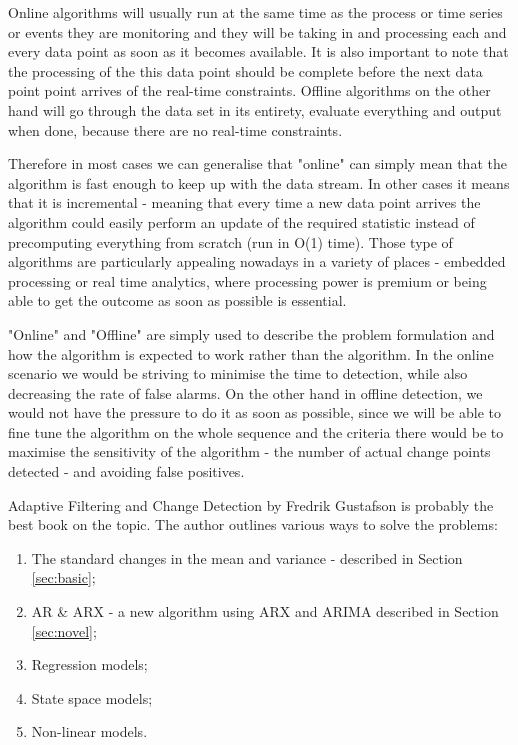 \documentclass[minf,twoside,singlespacing,parskip,frontabs,notimes,12pt]{infthesis} %
\begin{document}
Online algorithms will usually run at the same time as the process or time series or events they are monitoring and they will be taking in and processing each and every data point as soon as it becomes available. It is also important to note that the processing of the this data point should be complete before the next data point point arrives of the real-time constraints. Offline algorithms on the other hand will go through the data set in its entirety, evaluate everything and output when done, because there are no real-time constraints.

Therefore in most cases we can generalise that "online" can simply mean that the algorithm is fast enough to keep up with the data stream. In other cases it means that it is incremental - meaning that every time a new data point arrives the algorithm could easily perform an update of the required statistic instead of precomputing everything from scratch (run in O(1) time). Those type of algorithms are particularly appealing nowadays in a variety of places - embedded processing or real time analytics, where processing power is  premium or being able to get the outcome as soon as possible is essential. 

"Online" and "Offline" are simply used to describe the problem formulation and how the algorithm is expected to work rather than the algorithm. In the online scenario we would be striving to minimise the time to detection, while also decreasing the rate of false alarms. On the other hand in offline detection, we would not have the pressure to do it as soon as possible, since we will be able to fine tune the algorithm on the whole sequence and the criteria there would be to maximise the sensitivity of the algorithm - the number of actual change points detected - and avoiding false positives.

Adaptive Filtering and Change Detection \cite{Gustaf} by Fredrik Gustafson is probably the best book on the topic. The author outlines various ways to solve the problems:
\begin{enumerate}
\item The standard changes in the mean and variance - described in Section \ref{sec:basic};
\item AR \& ARX - a new algorithm using ARX and ARIMA described in Section \ref{sec:novel};
\item Regression models;
\item State space models;
\item Non-linear models.
\end{enumerate}
\end{document}
